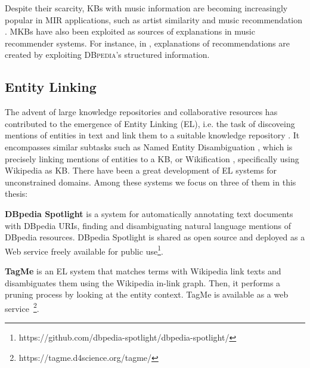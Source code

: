 Despite their scarcity, KBs with music information are becoming increasingly popular in MIR applications, such as artist similarity and music recommendation \citep{Celma2008,Leal2012,Ostuni2013}.
MKBs have also been exploited as sources of explanations in music recommender systems. %
For instance, in \citep{Passant2010}, explanations of recommendations are created by exploiting \textsc{DBpedia}'s structured information.%


\subsection{Entity Linking}
\label{sec:SOA:nlu:entity_linking}

The advent of large knowledge repositories and collaborative resources has contributed to the emergence of Entity Linking (EL), i.e. the task of discoveing mentions of entities in text and link them to a suitable knowledge repository \citep{Moroetal2014}. 
It encompasses similar subtasks such as Named Entity Disambiguation \citep{BunescuandPasca2006}, which is precisely linking mentions of entities to a KB, or Wikification \citep{MihalceaandCsomai2007}, specifically using Wikipedia as KB.
There have been a great development of EL systems for unconstrained domains. Among these systems we focus on three of them in this thesis:

\noindent \textbf{DBpedia Spotlight} \citep{Mendes2011} is a system for automatically annotating text documents with DBpedia URIs, finding and disambiguating natural language mentions of DBpedia resources. DBpedia Spotlight is shared as open source and deployed as a Web service freely available for public use\footnote{https://github.com/dbpedia-spotlight/dbpedia-spotlight/}.

\vspace{-0.2cm}
\noindent \textbf{TagMe} \citep{Ferragina2012} is an EL system that matches terms with Wikipedia link texts and disambiguates them using the Wikipedia in-link graph. Then, it performs a pruning process by looking at the entity context. TagMe is available as a web service~\footnote{https://tagme.d4science.org/tagme/}.

